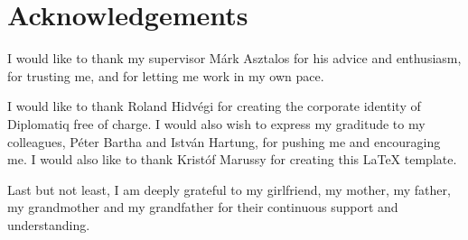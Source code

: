 \chapter*{Acknowledgements}
{}
\thispagestyle{plain}

I would like to thank my supervisor Márk Asztalos for his advice and enthusiasm, for trusting me, and for letting me work in my own pace.

I would like to thank Roland Hidvégi for creating the corporate identity of Diplomatiq free of charge. I would also wish to express my graditude to my colleagues, Péter Bartha and István Hartung, for pushing me and encouraging me. I would also like to thank Kristóf Marussy for creating this \LaTeX\xspace template.

Last but not least, I am deeply grateful to my girlfriend, my mother, my father, my grandmother and my grandfather for their continuous support and understanding.

